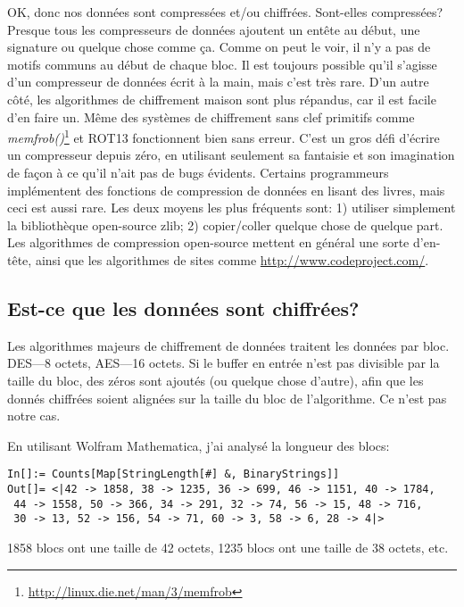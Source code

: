 OK, donc nos données sont compressées et/ou chiffrées.
Sont-elles compressées? Presque tous les compresseurs de données ajoutent un entête
au début, une signature ou quelque chose comme ça.
Comme on peut le voir, il n'y a pas de motifs communs au début de chaque bloc.
Il est toujours possible qu'il s'agisse d'un compresseur de données écrit à la main,
mais c'est très rare.
D'un autre côté, les algorithmes de chiffrement maison sont plus répandus, car il
est facile d'en faire un.
Même des systèmes de chiffrement sans clef primitifs comme \emph{memfrob()}\footnote{\url{http://linux.die.net/man/3/memfrob}}
et ROT13 fonctionnent bien sans erreur.
C'est un gros défi d'écrire un compresseur depuis zéro, en utilisant seulement sa
fantaisie et son imagination de façon à ce qu'il n'ait pas de bugs évidents.
Certains programmeurs implémentent des fonctions de compression de données en lisant
des livres, mais ceci est aussi rare.
Les deux moyens les plus fréquents sont:
1) utiliser simplement la bibliothèque open-source zlib;
2) copier/coller quelque chose de quelque part.
Les algorithmes de compression open-source mettent en général une sorte d'en-tête,
ainsi que les algorithmes de sites comme \url{http://www.codeproject.com/}.

\subsection{Est-ce que les données sont chiffrées?}

Les algorithmes majeurs de chiffrement de données traitent les données par bloc.
DES---8 octets, AES---16 octets. 
Si le buffer en entrée n'est pas divisible par la taille du bloc, des zéros sont
ajoutés (ou quelque chose d'autre), afin que les donnés chiffrées soient alignées
sur la taille du bloc de l'algorithme.
Ce n'est pas notre cas.

En utilisant Wolfram Mathematica, j'ai analysé la longueur des blocs:

\begin{lstlisting}
In[]:= Counts[Map[StringLength[#] &, BinaryStrings]]
Out[]= <|42 -> 1858, 38 -> 1235, 36 -> 699, 46 -> 1151, 40 -> 1784,
 44 -> 1558, 50 -> 366, 34 -> 291, 32 -> 74, 56 -> 15, 48 -> 716,
 30 -> 13, 52 -> 156, 54 -> 71, 60 -> 3, 58 -> 6, 28 -> 4|>
\end{lstlisting}

1858 blocs ont une taille de 42 octets, 1235 blocs ont une taille de 38 octets, etc.


